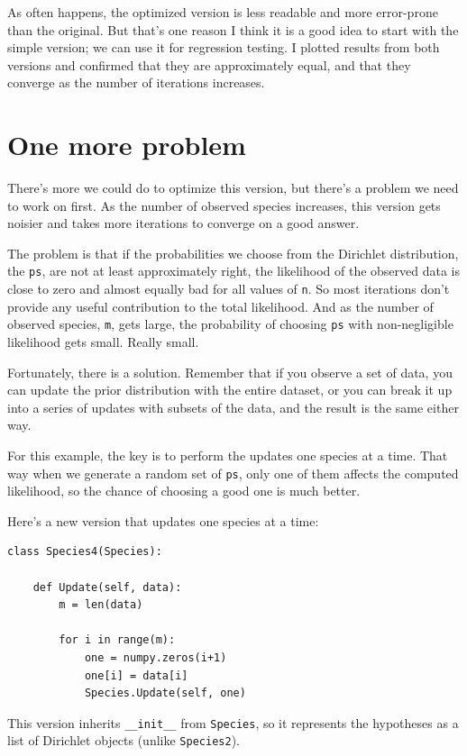 \documentclass[12pt]{book}
\begin{document}
As often happens, the optimized version is less readable and more
error-prone than the original.  But that's one reason I think it is
a good idea to start with the simple version; we can use it for
regression testing.  I plotted results from both versions and confirmed
that they are approximately equal, and that they converge as the
number of iterations increases.


\section{One more problem}

There's more we could do to optimize this version, but there's a 
problem we need to work on first.  As the number of observed
species increases, this version gets noisier and takes more
iterations to converge on a good answer.

The problem is that if the probabilities we choose from the Dirichlet
distribution, the {\tt ps}, are not at least approximately right,
the likelihood of the observed data is close to zero and almost
equally bad for all values of {\tt n}.  So most iterations don't
provide any useful contribution to the total likelihood.  And as the
number of observed species, {\tt m}, gets large, the probability of
choosing {\tt ps} with non-negligible likelihood gets small.  Really
small.

Fortunately, there is a solution.  Remember that if you observe
a set of data, you can update the prior distribution with the
entire dataset, or you can break it up into a series of updates
with subsets of the data, and the result is the same either way.

For this example, the key is to perform the updates one species at
a time.  That way when we generate a random set of {\tt ps}, only
one of them affects the computed likelihood, so the chance of choosing
a good one is much better.

Here's a new version that updates one species at a time:

\begin{verbatim}
class Species4(Species):

    def Update(self, data):
        m = len(data)

        for i in range(m):
            one = numpy.zeros(i+1)
            one[i] = data[i]            
            Species.Update(self, one)
\end{verbatim}

This version inherits \verb"__init__" from {\tt Species}, so it
represents the hypotheses as a list of Dirichlet objects (unlike
{\tt Species2}).
\end{document}
